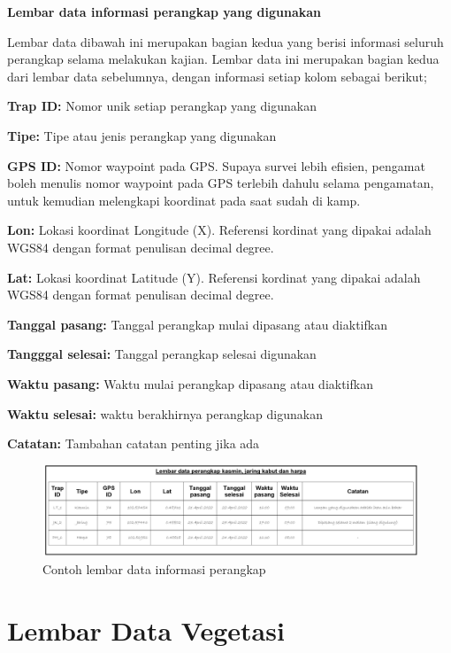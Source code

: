 \documentclass[
]{book}
\begin{document}
\textbf{Lembar data informasi perangkap yang digunakan}

Lembar data dibawah ini merupakan bagian kedua yang berisi informasi seluruh perangkap selama melakukan kajian. Lembar data ini merupakan bagian kedua dari lembar data sebelumnya, dengan informasi setiap kolom sebagai berikut;

\textbf{Trap ID:} Nomor unik setiap perangkap yang digunakan

\textbf{Tipe:} Tipe atau jenis perangkap yang digunakan

\textbf{GPS ID:} Nomor waypoint pada GPS. Supaya survei lebih efisien, pengamat boleh menulis nomor waypoint pada GPS terlebih dahulu selama pengamatan, untuk kemudian melengkapi koordinat pada saat sudah di kamp.

\textbf{Lon:} Lokasi koordinat Longitude (X). Referensi kordinat yang dipakai adalah WGS84 dengan format penulisan decimal degree.

\textbf{Lat:} Lokasi koordinat Latitude (Y). Referensi kordinat yang dipakai adalah WGS84 dengan format penulisan decimal degree.

\textbf{Tanggal pasang:} Tanggal perangkap mulai dipasang atau diaktifkan

\textbf{Tangggal selesai:} Tanggal perangkap selesai digunakan

\textbf{Waktu pasang:} Waktu mulai perangkap dipasang atau diaktifkan

\textbf{Waktu selesai:} waktu berakhirnya perangkap digunakan

\textbf{Catatan:} Tambahan catatan penting jika ada

\begin{figure}

{\centering \includegraphics[width=1\linewidth]{images/ldm_p} 

}

\caption{Contoh lembar data informasi perangkap}\label{fig:ldmp}
\end{figure}

\hypertarget{lembar-data-vegetasi}{%
\section*{Lembar Data Vegetasi}\label{lembar-data-vegetasi}}
\end{document}
